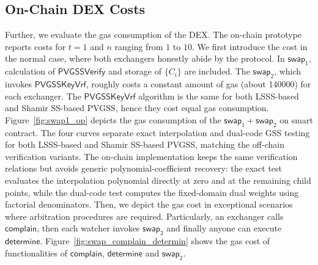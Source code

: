 \documentclass[runningheads]{llncs}
\newcommand{\pvgssVerify}{\mathsf{PVGSSVerify}}
\newcommand{\pvgssKeyVrf}{\mathsf{PVGSSKeyVrf}}
\begin{document}
\subsection{On-Chain DEX Costs}
Further, we evaluate the gas consumption of the DEX. The on-chain prototype reports costs for $t=1$ and $n$ ranging from $1$ to $10$.
We first introduce the cost in the normal case, where both exchangers honestly abide by the protocol.
In $\mathsf{swap}_1$, calculation of $\pvgssVerify$ and storage of $\{C_i\}$ are included.
The $\mathsf{swap}_2$, which invokes $\pvgssKeyVrf$, roughly costs a constant amount of gas (about 140000) for each exchanger.
The $\pvgssKeyVrf$ algorithm is the same for both LSSS-based and Shamir SS-based PVGSS, hence they cost equal gas consumption.
Figure~\ref{fig:swap1_op} depicts the gas consumption of the $\mathsf{swap}_1+\mathsf{swap}_2$ on smart contract.
The four curves separate exact interpolation and dual-code GSS testing for both LSSS-based and Shamir SS-based PVGSS, matching the off-chain verification variants.
The on-chain implementation keeps the same verification relations but avoids generic polynomial-coefficient recovery: the exact test evaluates the interpolation polynomial directly at zero and at the remaining child points, while the dual-code test computes the fixed-domain dual weights using factorial denominators.
Then, we depict the gas cost in exceptional scenarios where arbitration procedures are required. Particularly, an exchanger calls $\mathsf{complain}$, then each watcher invokes $\mathsf{swap}_2$ and finally anyone can execute $\mathsf{determine}$.
Figure~\ref{fig:swap_complain_determin} shows the gas cost of functionalities of $\mathsf{complain}$, $\mathsf{determine}$ and $\mathsf{swap}_2$.
\end{document}
